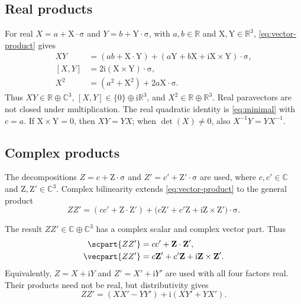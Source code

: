 \documentclass[11pt]{article}
\newcommand{\pv}[1]{{#1}}
\newcommand{\vstyle}[1]{{\bm{\mathrm{#1}}}}
\newcommand{\pX}{\pv{X}}
\newcommand{\pY}{\pv{Y}}
\newcommand{\pZ}{\pv{Z}}
\numberwithin{equation}{section}
\newcommand{\R}{\mathbb{R}}
\newcommand{\C}{\mathbb{C}}
\newcommand{\ii}{\mathrm{i}}
\newcommand{\dotprod}{\cdot}
\newcommand{\bsig}{\vstyle{\sigma}}
\newcommand{\bX}{\vstyle{X}}
\newcommand{\bY}{\vstyle{Y}}
\newcommand{\bZ}{\vstyle{Z}}
\begin{document}
\subsection{Real products}

For real $\pX=a+\bX\dotprod\bsig$ and $\pY=b+\bY\dotprod\bsig$, with
$a,b\in\R$ and $\bX,\bY\in\R^3$, \eqref{eq:vector-product} gives
\begin{align*}
 \pX \pY&=(ab+\bX\dotprod\bY)
 +(a\bY+b\bX+\ii\bX\times\bY)\dotprod\bsig,
 \\
 [\pX,\pY]&=2\ii(\bX\times\bY)\dotprod\bsig, \\
 \pX^2&=(a^2+\bX^2)+2a\bX\dotprod\bsig.
\end{align*}
Thus $\pX \pY\in\R\oplus\C^3$, $[\pX,\pY]\in\{0\}\oplus\ii\R^3$, and
$\pX^2\in\R\oplus\R^3$. Real paravectors are not closed under multiplication.
The real quadratic identity is \eqref{eq:minimal} with $c=a$.
If $\bX\times\bY=0$, then $\pX \pY=\pY \pX$; when $\det(\pX)\ne0$, also
$\pX^{-1}\pY=\pY \pX^{-1}$.

\subsection{Complex products}

The decompositions $\pZ=c+\bZ\dotprod\bsig$ and $\pZ'=c'+\bZ'\dotprod\bsig$ are used, where
$c,c'\in\C$ and $\bZ,\bZ'\in\C^3$.  Complex bilinearity extends
\eqref{eq:vector-product} to the general product
\begin{equation}
 \pZ \pZ'=(cc'+\bZ\dotprod\bZ')+
 \bigl(c\bZ'+c'\bZ+\ii\bZ\times\bZ'\bigr)\dotprod\bsig.
 \label{eq:para-product}
\end{equation}

The result $\pZ \pZ'\in\C\oplus\C^3$ has a complex scalar and complex vector part.
Thus
\begin{align*}
 \scpart{\pZ \pZ'}&=cc'+\bZ\dotprod\bZ',\\
 \vecpart{\pZ \pZ'}&=c\bZ'+c'\bZ+\ii\bZ\times\bZ'.
\end{align*}
Equivalently, $\pZ=\pX+\ii \pY$ and $\pZ'=\pX'+\ii \pY'$ are used with all four
factors real.  Their products need not be real, but distributivity gives
\begin{equation*}
 \pZ \pZ'=(\pX \pX'-\pY \pY')+\ii(\pX \pY'+\pY \pX').
\end{equation*}
\end{document}
